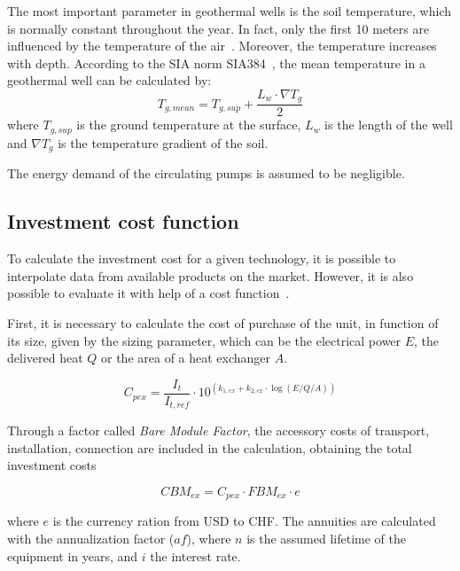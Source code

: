 \documentclass{article}
\begin{document}
The most important parameter in geothermal wells is the soil temperature, which is normally constant throughout the year. In fact, only the first 10 meters are influenced by the temperature of the air~\cite{hanSensitivityAnalysisVertical2016}. Moreover, the temperature increases with depth. According to the SIA norm SIA384~\cite{siaSIA384Sondes2010}, the mean temperature in a geothermal well can be calculated by:
\begin{equation}
T_{g, mean} = T_{g,sup} + \frac{L_{w} \cdot \nabla T_{g}}{2}
\end{equation}
where $T_{g,sup}$ is the ground temperature at the surface, $L_{w}$ is the length of the well and $ \nabla T_{g}$ is the temperature gradient of the soil. 

The energy demand of the circulating pumps is assumed to be negligible. 

\subsection{Investment cost function}\label{ss:ic}
To calculate the investment cost for a given technology, it is possible to interpolate data from available products on the market. However, it is also possible to evaluate it with help of a cost function~\cite{turtonrichardc.bailierichardwhitingwallace.AnalysisSynthesisDesign2003}.

First, it is necessary to calculate the cost of purchase of the unit, in function of its size, given by the sizing parameter, which can be the electrical power $E$, the delivered heat $Q$ or the area of a heat exchanger $A$.

\begin{equation}
C_{pex} = \frac{I_{t}}{I_{t,ref}} \cdot 10^ {(k_{1,ex} + k_{2,ex} \cdot \log(E/Q/A))}
\end{equation}

Through a factor called \emph{Bare Module Factor}, the accessory costs of transport, installation, connection are included in the calculation, obtaining the total investment costs

\begin{equation}
CBM_{ex} = C_{pex} \cdot FBM_{ex} \cdot e 
\end{equation}

where $e$ is the currency ration from USD to CHF. The annuities are calculated with the annualization factor ($af$), where $n$ is the assumed lifetime of the equipment in years, and $i$ the interest rate. 
\end{document}

